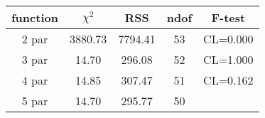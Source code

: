\begin{tabular}{c|c|c|c|c}
function & $\chi^2$ & RSS & ndof & F-test \\
\hline
2 par & 3880.73 & 7794.41 & 53 & CL=0.000 \\
3 par & 14.70 & 296.08 & 52 & CL=1.000 \\
4 par & 14.85 & 307.47 & 51 & CL=0.162 \\
5 par & 14.70 & 295.77 & 50 & \\
\hline
\end{tabular}